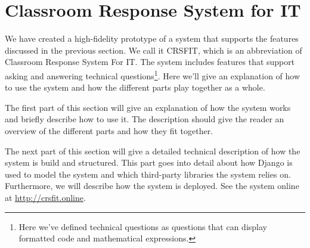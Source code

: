 \section{Classroom Response System for IT}

We have created a high-fidelity prototype of a system that supports the features discussed in the previous section. We call it CRSFIT, which is an abbreviation of Classroom Response System For IT. The system includes features that support asking and answering technical questions\footnote{Here we've defined technical questions as questions that can display formatted code and mathematical expressions.}. Here we'll give an explanation of how to use the system and how the different parts play together as a whole.

The first part of this section will give an explanation of how the system works and briefly describe how to use it. The description should give the reader an overview of the different parts and how they fit together.

The next part of this section will give a detailed technical description of how the system is build and structured. This part goes into detail about how Django is used to model the system and which third-party libraries the system relies on. Furthermore, we will describe how the system is deployed. See the system online at \url{http://crsfit.online}.

